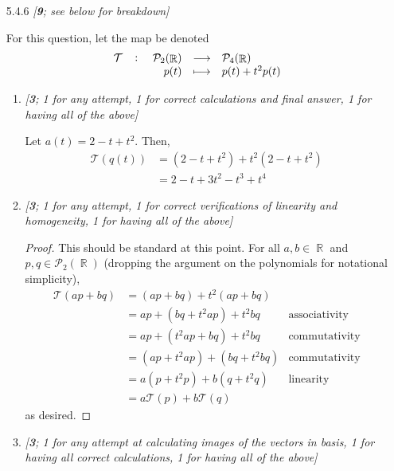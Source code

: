 \documentclass{amsart}
\theoremstyle{definition}
\theoremstyle{definition}
\DeclareMathOperator{\R}{\mathbb{R}}
\DeclareMathOperator{\1}{\mathbbm{1}}
\newcommand{\Tau}{\mathcal{T}}
\newcommand{\polyn}[2]{\mathcal{P}_{#1}(#2)}
\begin{document}
	
	\begin{enumerate}[itemsep = 2mm]
		\item[5.4.6] \textit{[\textbf{9}; see below for breakdown]}
		
		For this question, let the map be denoted
		\begin{align*}
		\fullfunction{\Tau}{\polyn{2}{\R}}{\polyn{4}{\R}}{p(t)}{p(t) + t^2 p(t)}
		\end{align*}
		
		\begin{enumerate}[label=(\alph*)]
			\item \textit{[\textbf{3}; 1 for any attempt, 1 for correct calculations and final answer, 1 for having all of the above]}
			
			Let $a(t) = 2-t+t^2$. Then,
			\begin{align*}
			\Tau(q(t)) &= (2 - t + t^2) + t^2 (2 - t + t^2) \\
			&= 2 - t + 3t^2 - t^3 + t^4
			\end{align*}
			
			
			\item \textit{[\textbf{3}; 1 for any attempt, 1 for correct verifications of linearity and homogeneity, 1 for having all of the above]}
			\begin{proof}
				This should be standard at this point. For all $a,b \in \R$ and $p, q \in \polyn{2}{\R}$ (dropping the argument on the polynomials for notational simplicity),
				\begin{align*}
					\Tau(ap + bq) &= (ap + bq) + t^2 (ap + bq) & \\
					&= ap + (bq + t^2 ap) + t^2 bq & \text{associativity} \\
					&= ap + (t^2 ap + bq) + t^2 bq & \text{commutativity} \\
					&= (ap + t^2 ap) + (bq + t^2 bq) & \text{commutativity} \\
					&= a(p + t^2 p) + b(q + t^2 q) & \text{linearity} \\
					&= a\Tau(p) + b\Tau(q)
				\end{align*}
				as desired.
			\end{proof}
		
			\item \textit{[\textbf{3}; 1 for any attempt at calculating images of the vectors in basis, 1 for having all correct calculations, 1 for having all of the above]}
			

\end{enumerate}
\end{enumerate}
\end{document}
